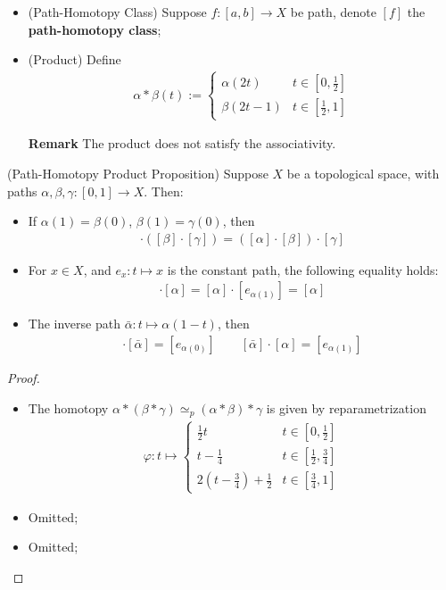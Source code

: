 \documentclass[Total.tex]{subfiles}
\begin{document}
	\begin{Def}
		\begin{itemize}
			\item (Path-Homotopy Class) Suppose $f:[a,b]\rightarrow X$ be path, denote $[f]$ the \textbf{path-homotopy class};
			\item (Product) Define
			\begin{gather*}
				\alpha*\beta(t):=\begin{cases}
					\alpha(2t)&t\in [0,\frac{1}{2}]\\
					\beta(2t-1)&t\in [\frac{1}{2},1]
				\end{cases}
			\end{gather*}
			
			\textbf{Remark} The product does not satisfy the associativity.
		\end{itemize}
	\end{Def}
	\begin{proposition}
		(Path-Homotopy Product Proposition) Suppose $X$ be a topological space, with paths $\alpha,\beta,\gamma:[0,1]\rightarrow X$. Then:
		
		\begin{itemize}
			\item If $\alpha(1)=\beta(0)$, $\beta(1)=\gamma(0)$, then
			\begin{gather*}
				[\alpha]\cdot ([\beta]\cdot [\gamma])=([\alpha]\cdot [\beta])\cdot [\gamma]
			\end{gather*}
			\item For $x\in X$, and $e_x:t\mapsto x$ is the constant path, the following equality holds:
			\begin{gather*}
				[e_{\alpha(0)}]\cdot [\alpha]=[\alpha]\cdot [e_{\alpha(1)}]=[\alpha]
			\end{gather*}
			\item The inverse path $\bar{\alpha}:t\mapsto \alpha(1-t)$, then
			\begin{gather*}
				[\alpha]\cdot [\bar{\alpha}]=[e_{\alpha(0)}]\qquad [\bar{\alpha}]\cdot [\alpha]=[e_{\alpha(1)}]
			\end{gather*}
		\end{itemize}
	\end{proposition}
	\begin{proof}
		\begin{itemize}
			\item The homotopy $\alpha*(\beta*\gamma)\simeq_p (\alpha*\beta)*\gamma$ is given by reparametrization
			\begin{gather*}
				\varphi:t\mapsto \begin{cases}
					\frac{1}{2}t&t\in [0,\frac{1}{2}]\\
					t-\frac{1}{4}&t\in [\frac{1}{2},\frac{3}{4}]\\
					2(t-\frac{3}{4})+\frac{1}{2}&t\in [\frac{3}{4},1]
				\end{cases}
			\end{gather*}
			\item Omitted;
			\item Omitted;
		\end{itemize}
	\end{proof}
\end{document}
